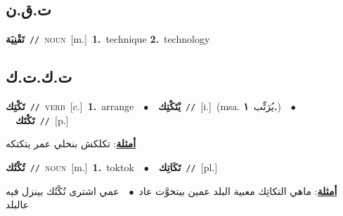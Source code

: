 \documentclass[10pt,a4paper,twoside]{article} %
\begin{document}
\begin{multicols}{2}
{{{{{{{{{{{{\vspace{-3mm}
\subsection*{\color{blue}\foreignlanguage{arabic}{ت.ق.ن}\color{blue}{ (ntws)}} 

{\setlength\topsep{0pt}\textbf{\foreignlanguage{arabic}{تَقْنِيَة}}\ {\color{gray}\texttt{//}\color{black}}\ \textsc{noun}\ [m.]\ \textbf{1.}~technique  \textbf{2.}~technology\ 

\vspace{-3mm}
\subsection*{\color{blue}\foreignlanguage{arabic}{ت.ك.ت.ك}\color{blue}{}} 

{\setlength\topsep{0pt}\textbf{\foreignlanguage{arabic}{تَكْتِك}}\ {\color{gray}\texttt{//}\color{black}}\ \textsc{verb}\ [c.]\ \textbf{1.}~arrange\ \ $\bullet$\ \ \setlength\topsep{0pt}\textbf{\foreignlanguage{arabic}{يْتَكْتِك}}\ {\color{gray}\texttt{//}\color{black}}\ [i.]\ \color{gray}(msa. \foreignlanguage{arabic}{يُرَتِّب}~\foreignlanguage{arabic}{\textbf{١.}})\color{black}\ \ $\bullet$\ \ \setlength\topsep{0pt}\textbf{\foreignlanguage{arabic}{تَكْتَك}}\ {\color{gray}\texttt{//}\color{black}}\ [p.]\  \begin{flushright}\color{gray}\foreignlanguage{arabic}{\textbf{\underline{\foreignlanguage{arabic}{أمثلة}}}: تكلكش بنخلي عمر يتكتكه}\end{flushright}\color{black}} \vspace{2mm}

{\setlength\topsep{0pt}\textbf{\foreignlanguage{arabic}{تُكْتُك}}\ {\color{gray}\texttt{//}\color{black}}\ \textsc{noun}\ [m.]\ \textbf{1.}~toktok\ \ $\bullet$\ \ \setlength\topsep{0pt}\textbf{\foreignlanguage{arabic}{تَكَاتِك}}\ {\color{gray}\texttt{//}\color{black}}\ [pl.]\  \begin{flushright}\color{gray}\foreignlanguage{arabic}{\textbf{\underline{\foreignlanguage{arabic}{أمثلة}}}: ماهي التكاتِك معبية البلد عمين بيتخوَّت عاد\ $\bullet$\ \  عمي اشترى تُكْتُك بينزل فيه عالبلد}\end{flushright}\color{black}} \vspace{2mm}

}}}}}}}}}}}}}
\end{multicols}
\end{document}
